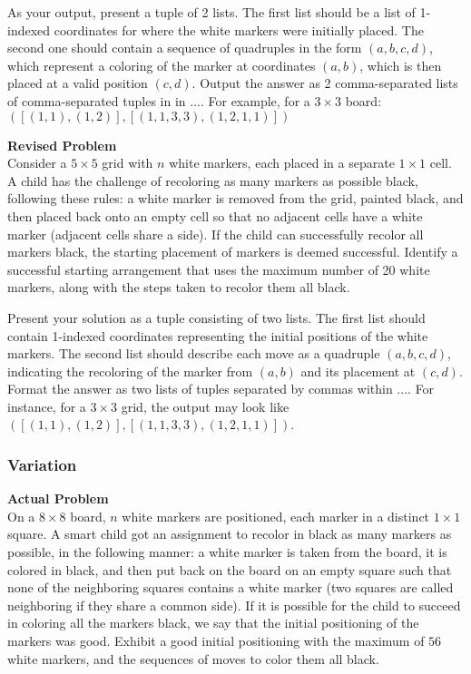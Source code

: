 As your output, present a tuple of 2 lists. The first list should be a list of 1-indexed coordinates for where the white markers were initially placed. The second one should contain a sequence of quadruples in the form $(a,b,c,d)$, which represent a coloring of the marker at coordinates $(a,b)$, which is then placed at a valid position $(c,d)$. Output the answer as 2 comma-separated lists of comma-separated tuples in in $\boxed{...}$. For example, for a $3\times 3$ board: $\boxed{([(1, 1), (1,2)], [(1,1,3,3), (1,2,1,1)])}$

\textbf{Revised Problem}\\
Consider a $5 \times 5$ grid with $n$ white markers, each placed in a separate $1 \times 1$ cell. A child has the challenge of recoloring as many markers as possible black, following these rules: a white marker is removed from the grid, painted black, and then placed back onto an empty cell so that no adjacent cells have a white marker (adjacent cells share a side). If the child can successfully recolor all markers black, the starting placement of markers is deemed successful. Identify a successful starting arrangement that uses the maximum number of 20 white markers, along with the steps taken to recolor them all black.

Present your solution as a tuple consisting of two lists. The first list should contain 1-indexed coordinates representing the initial positions of the white markers. The second list should describe each move as a quadruple $(a,b,c,d)$, indicating the recoloring of the marker from $(a,b)$ and its placement at $(c,d)$. Format the answer as two lists of tuples separated by commas within $\boxed{...}$. For instance, for a $3\times 3$ grid, the output may look like $\boxed{([(1, 1), (1,2)], [(1,1,3,3), (1,2,1,1)])}$.

\subsubsection{Variation}
\textbf{Actual Problem}\\
On a $8 \times 8$ board, $n$ white markers are positioned, each marker in a distinct $1 \times 1$ square. A smart child got an assignment to recolor in black as many markers as possible, in the following manner: a white marker is taken from the board, it is colored in black, and then put back on the board on an empty square such that none of the neighboring squares contains a white marker (two squares are called neighboring if they share a common side).
If it is possible for the child to succeed in coloring all the markers black, we say that the initial positioning of the markers was good. Exhibit a good initial positioning with the maximum of $56$ white markers, and the sequences of moves to color them all black.

